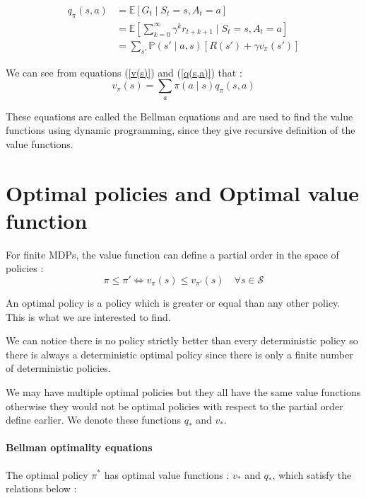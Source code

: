 \documentclass[14pt,a4paper]{article}
\def\iff{\Leftrightarrow}
\theoremstyle{definition}
\begin{document}
\begin{equation}
\begin{split}
q_{\pi}(s,a)&= \mathbb{E}\left[G_t\mid S_t=s, A_t=a\right]
\\&=\mathbb{E}\left[\sum_{k=0}^{\infty}\gamma^{k}r_{t+k+1}\mid S_t=s,A_t=a\right]
\\&= \sum_{s'}\mathbb{P}(s'\mid a,s)\left[R(s')+\gamma v_{\pi}(s')\right]
\end{split}
\label{q(s,a)}
\end{equation}



We can see from equations (\ref{v(s)}) and (\ref{q(s,a)})  that : 
\begin{equation}
v_{\pi}(s)=\sum_{a}\pi(a\mid s)q_{\pi}(s,a)
\end{equation}

These equations are called the Bellman equations and are used to find the value functions using dynamic programming, since they give recursive definition of the value functions.




\section{Optimal policies and Optimal value function}

For finite MDPs, the value function can define a partial order in the space of policies : 
$$ 
\pi\leq \pi' \iff v_{\pi} (s)\leq v_{\pi'} (s) \quad \forall s \in \mathcal{S}
$$

An optimal policy is a policy which is greater or equal than any other policy. This is what we are interested to find.

We can notice there is no policy strictly better than every deterministic policy \citep{Puterman} so there is always a deterministic optimal policy since there is only a finite number of deterministic policies.


We may have multiple optimal policies but they all have the same value functions otherwise they would not be optimal policies with respect to the partial order define earlier. We denote these functions $q_{*}$ and $v_{*}$.

\paragraph{Bellman optimality equations}

The optimal policy $\pi^*$ has  optimal value functions : $v_* $ and $ q_*$, which satisfy the relations below : 
\end{document}
